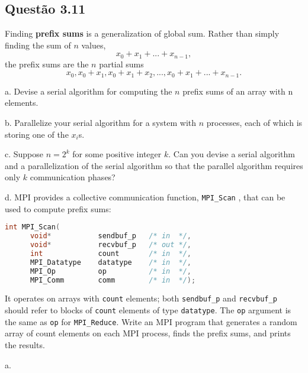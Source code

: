 

\subsection{Questão 3.11}

Finding \textbf{prefix sums} is a generalization of global sum. Rather than simply finding the sum of $n$ values,
\begin{equation*}
  x_{0} + x_{1} + ... + x_{n-1},
\end{equation*}
the prefix sums are the $n$ partial sums
\begin{equation*}
  x_{0}, x_{0} + x_{1} , x_{0} + x_{1} + x_{2} , ... , x_{0} + x_{1} + ... + x_{n-1}.
\end{equation*}


a. Devise a serial algorithm for computing the $n$ prefix sums of an array with n elements.

b. Parallelize your serial algorithm for a system with $n$ processes, each of which is storing one of the $x_{i}$s.

c. Suppose $n = 2^{k}$ for some positive integer $k$. Can you devise a serial algorithm and a parallelization of the serial algorithm so that the parallel algorithm requires only $k$ communication phases?

d. MPI provides a collective communication function, \texttt{MPI\_Scan} , that can be used to compute prefix sums:

\begin{lstlisting}[language=C]
int MPI_Scan(
      void*           sendbuf_p   /* in  */,
      void*           recvbuf_p   /* out */,
      int             count       /* in  */,
      MPI_Datatype    datatype    /* in  */,
      MPI_Op          op          /* in  */,
      MPI_Comm        comm        /* in  */);
\end{lstlisting}

It operates on arrays with \texttt{count} elements; both \texttt{sendbuf\_p} and \texttt{recvbuf\_p} should refer to blocks of \texttt{count} elements of type \texttt{datatype}. The \texttt{op} argument is the same as \texttt{op} for \texttt{MPI\_Reduce}. Write an MPI program that generates a random array of count elements on each MPI process, finds the prefix sums, and prints the results.

a.



